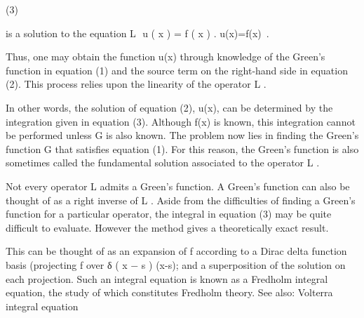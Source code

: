 (3)

is a solution to the equation L ⁡ u ( x ) = f ( x )   . {\displaystyle {} u(x)=f(x)~.}

Thus, one may obtain the function u(x) through knowledge of the Green's function in equation (1) and the source term on the right-hand side in equation (2). This process relies upon the linearity of the operator L {\displaystyle {} }.

In other words, the solution of equation (2), u(x), can be determined by the integration given in equation (3). Although f(x) is known, this integration cannot be performed unless G is also known. The problem now lies in finding the Green's function G that satisfies equation (1). For this reason, the Green's function is also sometimes called the fundamental solution associated to the operator L {\displaystyle {} }.

Not every operator L {\displaystyle {} } admits a Green's function. A Green's function can also be thought of as a right inverse of L {\displaystyle {} }. Aside from the difficulties of finding a Green's function for a particular operator, the integral in equation (3) may be quite difficult to evaluate. However the method gives a theoretically exact result.

This can be thought of as an expansion of f according to a Dirac delta function basis (projecting f over δ ( x − s ) {\displaystyle \delta (x-s)}; and a superposition of the solution on each projection. Such an integral equation is known as a Fredholm integral equation, the study of which constitutes Fredholm theory.
See also: Volterra integral equation
